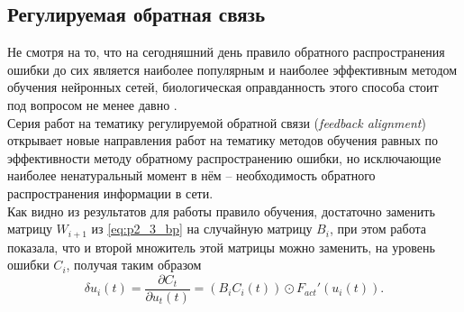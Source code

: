 \subsection{Регулируемая обратная связь}
\indent Не смотря на то, что на сегодняшний день правило обратного распространения ошибки до сих является наиболее популярным и наиболее эффективным методом обучения нейронных сетей, биологическая оправданность этого способа стоит под вопросом не менее давно \cite{rumelhart1986david, grossberg1987competitive, crick1989recent}.\\
\indent Серия работ на тематику регулируемой обратной связи (\textit{feedback alignment}) \cite{lillicrap2014random, nokland2016direct, liao2015important} открывает новые направления работ на тематику методов обучения равных по эффективности методу обратному распространению ошибки, но исключающие наиболее ненатуральный момент в нём -- необходимость обратного распространения информации в сети.\\
\indent Как видно из результатов \cite{lillicrap2014random} для работы правило обучения, достаточно заменить матрицу $W_{i+1}$ из \eqref{eq:p2_3_bp} на случайную матрицу $B_{i}$, при этом работа \cite{nokland2016direct} показала, что и второй множитель этой матрицы можно заменить, на уровень ошибки $C_{i}$, получая таким образом
\begin{equation} \label{eq:p2_3_fa}
\delta u_{i}(t) = \frac{\partial C_{t}}{\partial u_{t}(t)} = (B_{i} C_{i}(t)) \odot F_{act}'(u_{i}(t)).
\end{equation}
 
